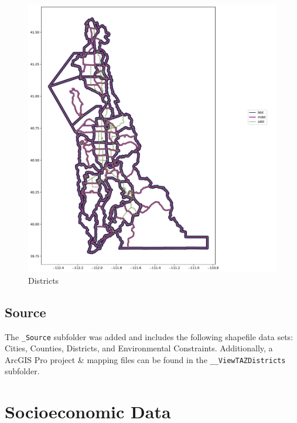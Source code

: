 \documentclass[
  letterpaper,
  DIV=11,
  numbers=noendperiod,
  titlepage=false]{scrreprt}
\begin{document}
\begin{figure}[H]

{\centering \includegraphics{v9x/v900/whats-new/2-inputdata_files/figure-pdf/fig-districts-pdf-output-1.pdf}

}

\caption{\label{fig-districts-pdf}Districts}

\end{figure}

\hypertarget{source}{%
\subsection{Source}\label{source}}

The \texttt{\_Source} subfolder was added and includes the following
shapefile data sets: Cities, Counties, Districts, and Environmental
Constraints. Additionally, a ArcGIS Pro project \& mapping files can be
found in the \texttt{\_\_ViewTAZDistricts} subfolder.

\hypertarget{socioeconomic-data}{%
\section{Socioeconomic Data}\label{socioeconomic-data}}
\end{document}
